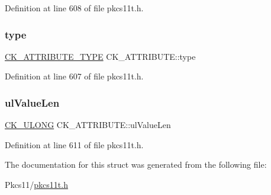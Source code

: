 Definition at line 608 of file pkcs11t.\+h.

\mbox{\label{struct_c_k___a_t_t_r_i_b_u_t_e_a75f2e734f30124dfd27f53010affab07}} 
\subsubsection{\texorpdfstring{type}{type}}
{\footnotesize\ttfamily \hyperlink{pkcs11t_8h_ad95456bab28dc2208c2d0e1d01f8ae8a}{C\+K\+\_\+\+A\+T\+T\+R\+I\+B\+U\+T\+E\+\_\+\+T\+Y\+PE} C\+K\+\_\+\+A\+T\+T\+R\+I\+B\+U\+T\+E\+::type}



Definition at line 607 of file pkcs11t.\+h.

\mbox{\label{struct_c_k___a_t_t_r_i_b_u_t_e_a645036d609793100f920d589b8d6d33b}} 
\subsubsection{\texorpdfstring{ul\+Value\+Len}{ulValueLen}}
{\footnotesize\ttfamily \hyperlink{pkcs11t_8h_a35181858a3b7a0a81f49d180d8f446ef}{C\+K\+\_\+\+U\+L\+O\+NG} C\+K\+\_\+\+A\+T\+T\+R\+I\+B\+U\+T\+E\+::ul\+Value\+Len}



Definition at line 611 of file pkcs11t.\+h.



The documentation for this struct was generated from the following file\+:\begin{DoxyCompactItemize}
\item 
Pkcs11/\hyperlink{pkcs11t_8h}{pkcs11t.\+h}\end{DoxyCompactItemize}
